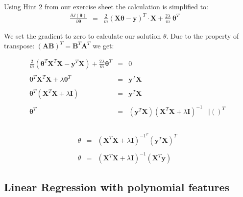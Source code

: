 \documentclass{article}
\begin{document}
\begin{itemize}
      \textrm{Using Hint 2 from our exercise sheet the calculation is simplified to:} \\
    
    $$\begin{array}{rclr}
        \frac{\partial J(\boldsymbol{\theta})}{\partial \boldsymbol{\theta}} & = & \frac{2}{m}(\boldsymbol{X\theta - y})^T \cdot \boldsymbol{X} + \frac{2\lambda}{m}\ \boldsymbol{\theta}^T & 
    \end{array}$$

    We set the gradient to zero to calculate our solution $\theta$.	Due to the property of transpose: $ (\boldsymbol{A}\boldsymbol{B})^T = \boldsymbol{B}^T\boldsymbol{A}^T $ we get:
    
    $$\begin{array}{rclr}    
    \frac{2}{m}(\boldsymbol{\theta}^T \boldsymbol{X}^T \boldsymbol{X} - \boldsymbol{y}^T \boldsymbol{X}) + \frac{2\lambda}{m}\boldsymbol{\theta}^T & = & 0 \\\\
    \boldsymbol{\theta}^T \boldsymbol{X}^T \boldsymbol{X} + \lambda \boldsymbol{\theta}^T & = & \boldsymbol{y}^T \boldsymbol{X} & \\\\
    \boldsymbol{\theta}^T (\boldsymbol{X}^T \boldsymbol{X} + \lambda \boldsymbol{I}) & = & \boldsymbol{y}^T\boldsymbol{X} & \\\\
    \boldsymbol{\theta}^T & = & (\boldsymbol{y}^T \boldsymbol{X})(\boldsymbol{X}^T \boldsymbol{X} + \lambda \boldsymbol{I})^{-1} & \mid ()^T \\\\
    \end{array}$$

	
	$$\begin{array}{rcl}
	
    \theta & = & (\boldsymbol{X}^T\boldsymbol{X} + \lambda\boldsymbol{I})^{-1^T} (\boldsymbol{y}^T\boldsymbol{X})^T \\\\
    \theta & = & (\boldsymbol{X}^T\boldsymbol{X} + \lambda\boldsymbol{I})^{-1} (\boldsymbol{X}^T\boldsymbol{y})
	\end{array}$$
    
\end{itemize}

\newpage

\subsection{Linear Regression with polynomial features}
\end{document}
